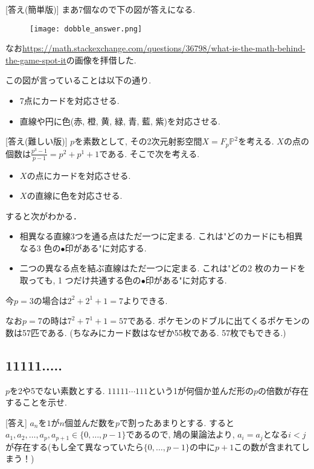 \documentclass[dvipdfmx,a4paper,12pt]{article} %
\theoremstyle{definition}
\theoremstyle{remark}
\numberwithin{equation}{section}
\begin{document}
[答え(簡単版)]
まあ7個なので下の図が答えになる.
\begin{figure}[htbp]
\begin{center}
\texttt{[image: dobble\_answer.png]}
\end{center}
\end{figure}
なお\url{https://math.stackexchange.com/questions/36798/what-is-the-math-behind-the-game-spot-it}の画像を拝借した.

この図が言っていることは以下の通り.
\begin{itemize}
\item 7点にカードを対応させる.
\item 直線や円に色(赤, 橙, 黄, 緑, 青, 藍, 紫)を対応させる.
\end{itemize}

[答え(難しい版)]
$p$を素数として, その2次元射影空間$X=F_p\mathbb{P}^{2}$を考える. 
$X$の点の個数は$\frac{p^3 - 1}{p-1}=p^2 + p^1 + 1$である.
そこで次を考える.
\begin{itemize}
\item $X$の点にカードを対応させる.
\item $X$の直線に色を対応させる.
\end{itemize}

すると次がわかる．
\begin{itemize}
\item 相異なる直線3つを通る点はただ一つに定まる. 
これは"どのカードにも相異なる3 色の$\bullet$印がある"に対応する. 
\item 二つの異なる点を結ぶ直線はただ一つに定まる. 
これは"どの2 枚のカードを取っても, 1 つだけ共通する色の$\bullet$印がある"に対応する. 
\end{itemize}
今$p=3$の場合は$2^2 + 2^1 + 1=7$よりできる. 

なお$p=7$の時は$7^2 + 7^1 + 1=57$である. 
ポケモンのドブルに出てくるポケモンの数は57匹である. (ちなみにカード数はなぜか55枚である. 57枚でもできる.) 

\subsection{11111.....}

\begin{tcolorbox}[mybox]
$p$を2や5でない素数とする. 
$11111\cdots 111$という1が何個か並んだ形の$p$の倍数が存在することを示せ.
\end{tcolorbox}

[答え]
$a_n$を$1$が$n$個並んだ数を$p$で割ったあまりとする. 
すると$a_1, a_2, \ldots, a_{p}, a_{p+1} \in \{0, \ldots, p-1\}$であるので, 鳩の巣論法より, 
$a_i =a_j$となる$i<j$が存在する(もし全て異なっていたら$\{0, \ldots, p-1\}$の中に$p+1$この数が含まれてしまう！)
\end{document}

